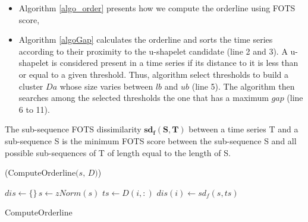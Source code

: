 \begin{itemize}
\item Algorithm  \ref{algo_order} presents how we compute the orderline using FOTS score,
\item Algorithm \ref{algoGap} calculates the orderline and sorts the time series according to their proximity to the u-shapelet candidate (line 2 and 3). A u-shapelet is considered present in a time series if its distance to it is less than or equal to a given threshold. Thus, algorithm select thresholds to build a cluster $Da$ whose size varies between $lb$ and $ub$ (line 5).  The algorithm then searches among the selected thresholds the one that has a maximum $gap$ (line 6 to 11).
\end{itemize}

  
  

 \begin{definition}
The sub-sequence FOTS dissimilarity $\boldsymbol{sd_f(S, T)}$ between
a time series T and a sub-sequence S is the minimum  FOTS
score between the sub-sequence S and all possible
sub-sequences of T of length equal to the length of S.
\end{definition}


\begin{algorithm}[h]
\DontPrintSemicolon
{}

\Begin($\text{ComputeOrderline} {(} s, \, D{)}$)
{
  $dis \leftarrow \{\} \, s \leftarrow zNorm(s)$\;
  {
    $ts \leftarrow D(i,:)$\;
    $dis(i) \leftarrow sd_f(s,ts)$\;    
  }  

}
\caption{ComputeOrderline}
\label{algo_order}
\end{algorithm}



